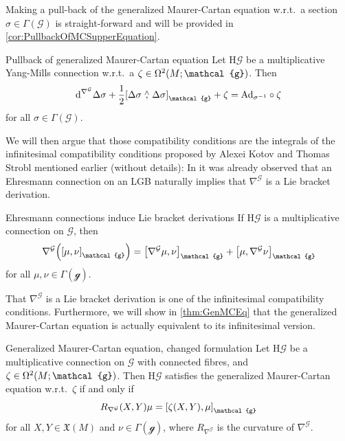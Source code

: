 \documentclass[reqno,a4paper,oneside]{amsart}
\theoremstyle{plain}
\theoremstyle{remark}
\theoremstyle{definition}
\begin{document}
Making a pull-back of the generalized Maurer-Cartan equation w.r.t.\ a section $\sigma \in \Gamma(\mathcal{G})$ is straight-forward and will be provided in \ref{cor:PullbackOfMCSupperEquation}.

\begin{corollaries*}{Pullback of generalized Maurer-Cartan equation}
Let $\mathrm{H}\mathcal{G}$ be a multiplicative Yang-Mills connection w.r.t.\ a $\zeta \in \Omega^2\mleft( M; \mathcal{g} \mright)$. Then
\begin{equation*}
\mathrm{d}^{\nabla^{\mathcal{G}}} \Delta \sigma 
	+ \frac{1}{2} \mleft[ \Delta \sigma \stackrel{\wedge}{,} \Delta\sigma \mright]_{\mathcal{g}} 
	+ \zeta 
=
\mathrm{Ad}_{\sigma^{-1}} \circ \zeta
\end{equation*}
for all $\sigma \in \Gamma(\mathcal{G})$.
\end{corollaries*}

We will then argue that those compatibility conditions are the integrals of the infinitesimal compatibility conditions proposed by Alexei Kotov and Thomas Strobl mentioned earlier (without details): In \cite{LAURENTGENGOUXStienonXuMultiplicativeForms} it was already observed that an Ehresmann connection on an LGB naturally implies that $\nabla^{\mathcal{G}}$ is a Lie bracket derivation.

\begin{lemmata*}{Ehresmann connections induce Lie bracket derivations}
If $\mathrm{H}\mathcal{G}$ is a multiplicative connection on $\mathcal{G}$, then
\begin{equation*}
\nabla^{\mathcal{G}}\mleft( \mleft[ \mu, \nu \mright]_{\mathcal{g}} \mright)
=
\mleft[ \nabla^{\mathcal{G}} \mu, \nu \mright]_{\mathcal{g}}
	+ \mleft[ \mu, \nabla^{\mathcal{G}} \nu \mright]_{\mathcal{g}}
\end{equation*} 
for all $\mu, \nu \in \Gamma(\mathcal{g})$.
\end{lemmata*}

That $\nabla^{\mathcal{G}}$ is a Lie bracket derivation is one of the infinitesimal compatibility conditions.
Furthermore, we will show in \ref{thm:GenMCEq} that the generalized Maurer-Cartan equation is actually equivalent to its infinitesimal version.

\begin{theorems*}{Generalized Maurer-Cartan equation, changed formulation}
Let $\mathrm{H}\mathcal{G}$ be a multiplicative connection on $\mathcal{G}$ with connected fibres, and $\zeta \in \Omega^2\mleft( M; \mathcal{g} \mright)$. Then $\mathrm{H}\mathcal{G}$ satisfies the generalized Maurer-Cartan equation w.r.t.\ $\zeta$ if and only if 
\begin{equation*}
R_{\nabla^{\mathcal{G}}}(X, Y)\mu
=
\mleft[ \zeta(X, Y), \mu \mright]_{\mathcal{g}}
\end{equation*}
for all $X, Y \in \mathfrak{X}(M)$ and $\nu \in \Gamma(\mathcal{g})$, where $R_{\nabla^{\mathcal{G}}}$ is the curvature of $\nabla^{\mathcal{G}}$.
\end{theorems*}
\end{document}
